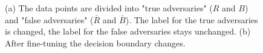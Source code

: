 \begin{figure}[t]
    \centering
    \hspace*{\fill}
    \quad
    \hspace*{\fill}
    \caption{(a) The data points are divided into "true adversaries" ($R$ and $B$) and "false adversaries" ($\bar{R}$ and $\bar{B}$). The label for the true adversaries is changed, the label for the false adversaries stays unchanged. (b) After fine-tuning the decision boundary changes. \cite{merrer_adversarial_2019}}
    \label{fig:merrer}
\end{figure}